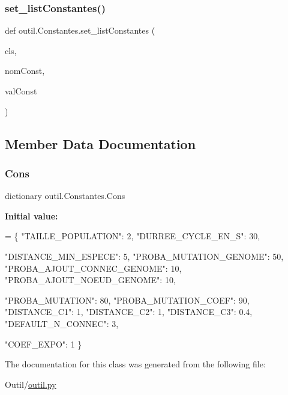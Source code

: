 \mbox{\label{classoutil_1_1_constantes_af35fe7ebb9df8350160593eeb2436849}} 
\subsubsection{\texorpdfstring{set\+\_\+list\+Constantes()}{set\_listConstantes()}}
{\footnotesize\ttfamily def outil.\+Constantes.\+set\+\_\+list\+Constantes (\begin{DoxyParamCaption}\item[{}]{cls,  }\item[{}]{nom\+Const,  }\item[{}]{val\+Const }\end{DoxyParamCaption})}



\subsection{Member Data Documentation}
\mbox{\label{classoutil_1_1_constantes_acff4386578b87455388730ad468cbe64}} 
\subsubsection{\texorpdfstring{Cons}{Cons}}
{\footnotesize\ttfamily dictionary outil.\+Constantes.\+Cons\hspace{0.3cm}{\ttfamily [static]}}

{\bfseries Initial value\+:}
\begin{DoxyCode}
=  \{
        \textcolor{stringliteral}{"TAILLE\_POPULATION"}: 2,
        \textcolor{stringliteral}{"DURREE\_CYCLE\_EN\_S"}: 30,

        \textcolor{stringliteral}{"DISTANCE\_MIN\_ESPECE"}: 5,
        \textcolor{stringliteral}{"PROBA\_MUTATION\_GENOME"}: 50,
        \textcolor{stringliteral}{"PROBA\_AJOUT\_CONNEC\_GENOME"}: 10,
        \textcolor{stringliteral}{"PROBA\_AJOUT\_NOEUD\_GENOME"}: 10,

        \textcolor{stringliteral}{"PROBA\_MUTATION"}: 80,
        \textcolor{stringliteral}{"PROBA\_MUTATION\_COEF"}: 90,
        \textcolor{stringliteral}{"DISTANCE\_C1"}: 1,
        \textcolor{stringliteral}{"DISTANCE\_C2"}: 1,
        \textcolor{stringliteral}{"DISTANCE\_C3"}: 0.4,
        \textcolor{stringliteral}{"DEFAULT\_N\_CONNEC"}: 3,

        \textcolor{stringliteral}{"COEF\_EXPO"}: 1
       \}
\end{DoxyCode}


The documentation for this class was generated from the following file\+:\begin{DoxyCompactItemize}
\item 
Outil/\hyperlink{outil_8py}{outil.\+py}\end{DoxyCompactItemize}
